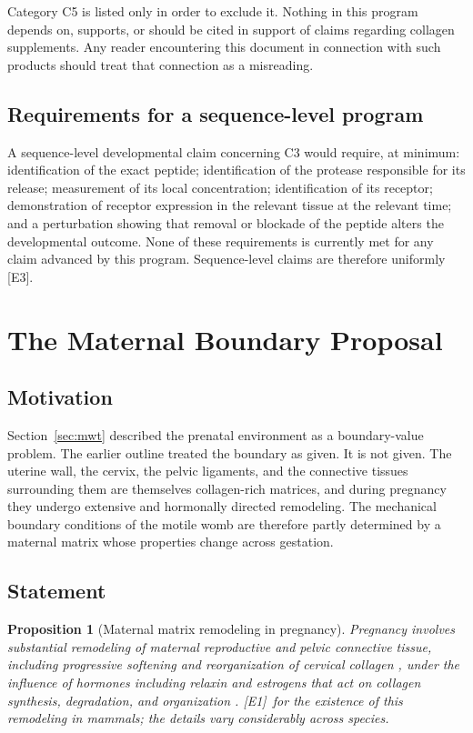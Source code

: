 \documentclass[11pt,a4paper]{article}
\theoremstyle{plain}
\newtheorem{proposition}{Proposition}[section]
\theoremstyle{definition}
\theoremstyle{remark}
\newcommand{\tier}[1]{\textup{\textsc{[#1]}}}
\newcommand{\Eone}{\tier{E1}}
\newcommand{\Ethree}{\tier{E3}}
\begin{document}
\begin{caution}
Category C5 is listed only in order to exclude it. Nothing in this program depends on, supports, or should be cited in support of claims regarding collagen supplements. Any reader encountering this document in connection with such products should treat that connection as a misreading.
\end{caution}

\subsection{Requirements for a sequence-level program}

A sequence-level developmental claim concerning C3 would require, at minimum: identification of the exact peptide; identification of the protease responsible for its release; measurement of its local concentration; identification of its receptor; demonstration of receptor expression in the relevant tissue at the relevant time; and a perturbation showing that removal or blockade of the peptide alters the developmental outcome. None of these requirements is currently met for any claim advanced by this program. Sequence-level claims are therefore uniformly \Ethree.
\section{The Maternal Boundary Proposal}\label{sec:maternal}

\subsection{Motivation}

Section~\ref{sec:mwt} described the prenatal environment as a boundary-value problem. The earlier outline treated the boundary as given. It is not given. The uterine wall, the cervix, the pelvic ligaments, and the connective tissues surrounding them are themselves collagen-rich matrices, and during pregnancy they undergo extensive and hormonally directed remodeling. The mechanical boundary conditions of the motile womb are therefore partly determined by a maternal matrix whose properties change across gestation.

\subsection{Statement}

\begin{proposition}[Maternal matrix remodeling in pregnancy]\label{prop:maternalremodel}
Pregnancy involves substantial remodeling of maternal reproductive and pelvic connective tissue, including progressive softening and reorganization of cervical collagen \cite{word2007}, under the influence of hormones including relaxin and estrogens that act on collagen synthesis, degradation, and organization \cite{sherwood2004}. \Eone\ for the existence of this remodeling in mammals; the details vary considerably across species.
\end{proposition}
\end{document}

